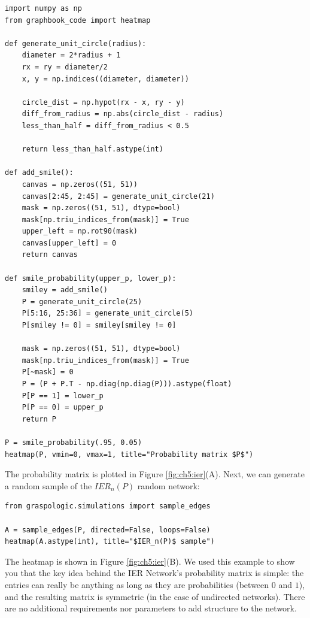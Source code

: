 \begin{lstlisting}[style=python]
import numpy as np
from graphbook_code import heatmap

def generate_unit_circle(radius):
    diameter = 2*radius + 1
    rx = ry = diameter/2
    x, y = np.indices((diameter, diameter))

    circle_dist = np.hypot(rx - x, ry - y)
    diff_from_radius = np.abs(circle_dist - radius)
    less_than_half = diff_from_radius < 0.5

    return less_than_half.astype(int)

def add_smile():
    canvas = np.zeros((51, 51))
    canvas[2:45, 2:45] = generate_unit_circle(21)
    mask = np.zeros((51, 51), dtype=bool)
    mask[np.triu_indices_from(mask)] = True
    upper_left = np.rot90(mask)
    canvas[upper_left] = 0
    return canvas
    
def smile_probability(upper_p, lower_p):
    smiley = add_smile()
    P = generate_unit_circle(25)
    P[5:16, 25:36] = generate_unit_circle(5)
    P[smiley != 0] = smiley[smiley != 0]
    
    mask = np.zeros((51, 51), dtype=bool)
    mask[np.triu_indices_from(mask)] = True
    P[~mask] = 0
    P = (P + P.T - np.diag(np.diag(P))).astype(float)
    P[P == 1] = lower_p
    P[P == 0] = upper_p
    return P

P = smile_probability(.95, 0.05)
heatmap(P, vmin=0, vmax=1, title="Probability matrix $P$")
\end{lstlisting}

The probability matrix is plotted in Figure \ref{fig:ch5:ier}(A). Next, we can generate a random sample of the $IER_n(P)$ random network:

\begin{lstlisting}[style=python]
from graspologic.simulations import sample_edges

A = sample_edges(P, directed=False, loops=False)
heatmap(A.astype(int), title="$IER_n(P)$ sample")
\end{lstlisting}

The heatmap is shown in Figure \ref{fig:ch5:ier}(B). We used this example to show you that the key idea behind the IER Network's probability matrix is simple: the entries can really be anything as long as they are probabilities (between $0$ and $1$), and the resulting matrix is symmetric (in the case of undirected networks). There are no additional requirements nor parameters to add structure to the network.

